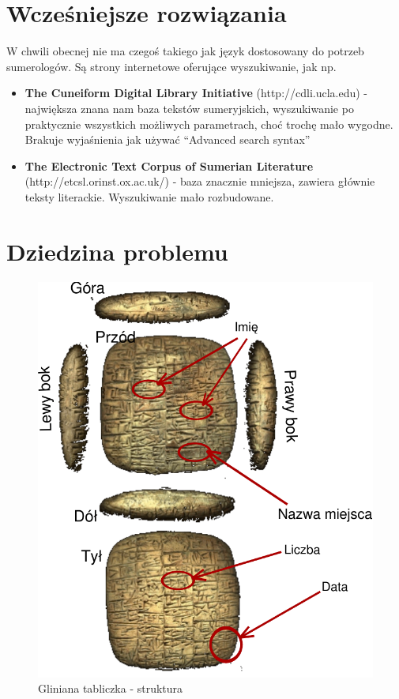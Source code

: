 \documentclass{pracamgr}
\begin{document}
\chapter{Wcześniejsze rozwiązania}\label{r:losers}
W chwili obecnej nie ma czegoś takiego jak język dostosowany do potrzeb sumerologów. Są strony internetowe oferujące wyszukiwanie, 
jak np.
\begin{itemize}
\item \textbf{The Cuneiform Digital Library Initiative} (http://cdli.ucla.edu) - największa znana nam baza tekstów sumeryjskich, 
wyszukiwanie po praktycznie wszystkich możliwych parametrach, choć trochę mało wygodne. Brakuje wyjaśnienia jak 
używać ``Advanced search syntax''
\item \textbf{The Electronic Text Corpus of Sumerian Literature} (http://etcsl.orinst.ox.ac.uk/) - baza znacznie mniejsza, zawiera 
głównie teksty literackie. Wyszukiwanie mało rozbudowane.
\end{itemize}

\chapter{Dziedzina problemu}

\begin{figure}
 \centering
 \includegraphics[bb=0 0 342 405]{./diagramy/tabliczka.pdf}
 \caption{Gliniana tabliczka - struktura}
\end{figure}
\end{document}
